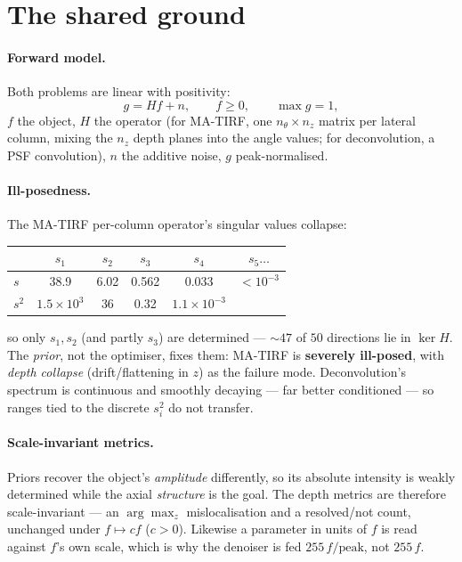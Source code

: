 \section{The shared ground}
\label{sec:preamble}

\paragraph{Forward model.}
Both problems are linear with positivity:
\begin{equation}
  g = Hf + n, \qquad f \ge 0, \qquad \max g = 1,
  \label{eq:forward}
\end{equation}
$f$ the object, $H$ the operator (for MA-TIRF, one $n_\theta\times n_z$ matrix per lateral column,
mixing the $n_z$ depth planes into the angle values; for deconvolution, a PSF convolution), $n$ the
additive noise, $g$ peak-normalised.

\paragraph{Ill-posedness.}
The MA-TIRF per-column operator's singular values collapse:
\begin{center}
\begin{tabular}{lccccc}
\toprule
 & $s_1$ & $s_2$ & $s_3$ & $s_4$ & $s_5\dots$ \\
\midrule
$s$   & 38.9 & 6.02 & 0.562 & 0.033 & $<10^{-3}$ \\
$s^2$ & $1.5\times10^{3}$ & 36 & 0.32 & $1.1\times10^{-3}$ & \\
\bottomrule
\end{tabular}
\end{center}
so only $s_1,s_2$ (and partly $s_3$) are determined --- ${\sim}47$ of $50$ directions lie in
$\ker H$. The \emph{prior}, not the optimiser, fixes them: MA-TIRF is \textbf{severely ill-posed},
with \emph{depth collapse} (drift/flattening in $z$) as the failure mode. Deconvolution's spectrum
is continuous and smoothly decaying --- far better conditioned --- so ranges tied to the discrete
$s_i^2$ do not transfer.

\paragraph{Scale-invariant metrics.}
Priors recover the object's \emph{amplitude} differently, so its absolute intensity is weakly
determined while the axial \emph{structure} is the goal. The depth metrics are therefore
scale-invariant --- an $\arg\max_z$ mislocalisation and a resolved/not count, unchanged under
$f \mapsto cf$ ($c>0$). Likewise a parameter in units of $f$ is read against $f$'s own scale, which
is why the denoiser is fed $255\,f/\text{peak}$, not $255\,f$.

